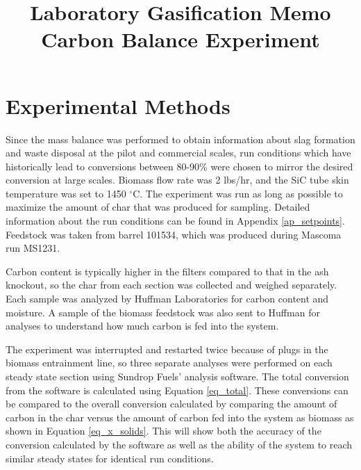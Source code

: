 \documentclass[11pt,twocolumn]{article}
\date{}
\title{Laboratory Gasification Memo\\Carbon Balance Experiment \vspace{-6ex}}
\begin{document}

\section*{Experimental Methods}

Since the mass balance was performed to obtain information about slag formation and waste disposal at the pilot and commercial scales, run conditions which have historically lead to conversions between 80-90\% were chosen to mirror the desired conversion at large scales.  Biomass flow rate was 2 lbs/hr, and the SiC tube skin temperature was set to 1450 $^\circ$C.  The experiment was run as long as possible to maximize the amount of char that was produced for sampling.  Detailed information about the run conditions can be found in Appendix \ref{ap_setpoints}.  Feedstock was taken from barrel 101534, which was produced during Mascoma run MS1231.

Carbon content is typically higher in the filters compared to that in the ash knockout, so the char from each section was collected and weighed separately.  Each sample was analyzed by Huffman Laboratories for carbon content and moisture.  A sample of the biomass feedstock was also sent to Huffman for analyses to understand how much carbon is fed into the system.

The experiment was interrupted and restarted twice because of plugs in the biomass entrainment line, so three separate analyses were performed on each steady state section using Sundrop Fuels' analysis software.  The total conversion from the software is calculated using Equation \ref{eq_total}.  These conversions can be compared to the overall conversion calculated by comparing the amount of carbon in the char versus the amount of carbon fed into the system as biomass as shown in Equation \ref{eq_x_solids}.  This will show both the accuracy of the conversion calculated by the software as well as the ability of the system to reach similar steady states for identical run conditions.
\end{document}
